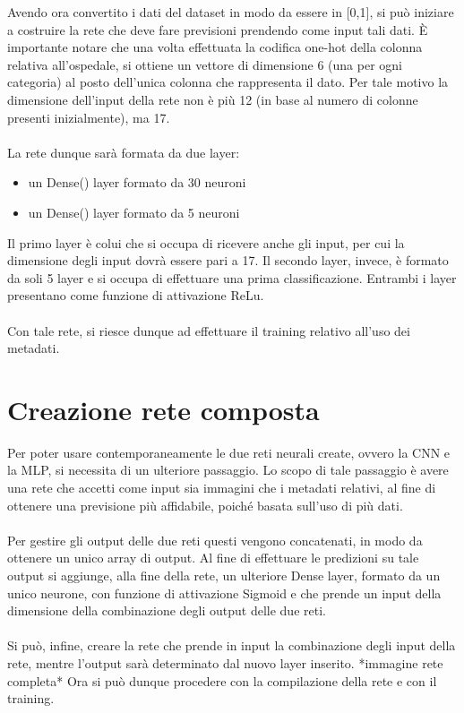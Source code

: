 Avendo ora convertito i dati del dataset in modo da essere in [0,1], si può iniziare a costruire la rete che deve fare previsioni 
prendendo come input tali dati. 
È importante notare che una volta effettuata la codifica one-hot della colonna relativa all'ospedale, si ottiene un vettore di dimensione 6 (una per ogni categoria) al 
posto dell'unica colonna che rappresenta il dato. Per tale motivo la dimensione dell'input della rete non è 
più 12 (in base al numero di colonne presenti inizialmente), ma 17.
\\\\
La rete dunque sarà formata da due layer:
\begin{itemize}
    \item un Dense() layer formato da 30 neuroni
    \item un Dense() layer formato da 5 neuroni
\end{itemize}
Il primo layer è colui che si occupa di ricevere anche gli input, per cui la dimensione degli input dovrà essere pari a 17.
Il secondo layer, invece, è formato da soli 5 layer e si occupa di effettuare una prima classificazione.
Entrambi i layer presentano come funzione di attivazione ReLu.
\\\\
Con tale rete, si riesce dunque ad effettuare il training relativo all'uso dei metadati.

\section{Creazione rete composta}
Per poter usare contemporaneamente le due reti neurali create, ovvero la CNN e la MLP, si necessita di 
un ulteriore passaggio.
Lo scopo di tale passaggio è avere una rete che accetti come input sia immagini che i metadati relativi, al fine
di ottenere una previsione più affidabile, poiché basata sull'uso di più dati.
\\\\
Per gestire gli output delle due reti questi vengono concatenati, in modo da ottenere un unico array di output.
Al fine di effettuare le predizioni su tale output si aggiunge, alla fine della rete, un ulteriore 
Dense layer, formato da un unico neurone, con funzione di attivazione Sigmoid e che prende un input della 
dimensione della combinazione degli output delle due reti. 
\\\\
Si può, infine, creare la rete che prende in input la combinazione degli input della rete, mentre l'output sarà determinato
dal nuovo layer inserito.
*immagine rete completa*
Ora si può dunque procedere con la compilazione della rete e con il training.  